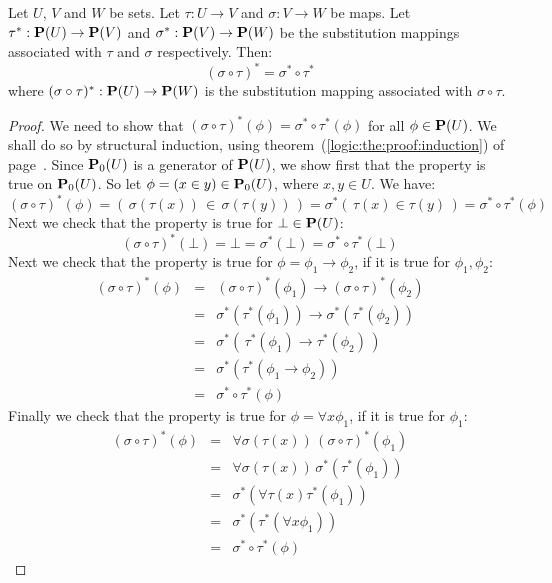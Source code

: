 \begin{prop}\label{logic:prop:substitution:composition}
    Let $U$, $V$ and $W$ be sets. Let $\tau:U\to V$ and $\sigma:V\to W$
    be maps. Let $\tau^{*}:{\bf P}(U)\to\mbox{${\bf P}(V)$}$ and $\sigma^{*}:\mbox{${\bf P}(V)$}\to{\bf
    P}(W)$ be the substitution mappings associated with $\tau$ and
    $\sigma$ respectively. Then:
    \[
        (\sigma\circ\tau)^{*}
        =
        \sigma^{*}\circ\tau^{*}
    \]
    where $(\sigma\circ\tau)^{*}:{\bf P}(U)\to {\bf P}(W)$ is the
    substitution mapping associated with $\sigma\circ\tau$.
\end{prop}
\begin{proof}
We need to show that
$(\sigma\circ\tau)^{*}(\phi)=\sigma^{*}\circ\tau^{*}(\phi)$ for all
$\phi\in{\bf P}(U)$. We shall do so by structural induction, using
theorem~(\ref{logic:the:proof:induction}) of
page~\pageref{logic:the:proof:induction}. Since ${\bf P}_{0}(U)$ is
a generator of ${\bf P}(U)$, we show first that the property is true
on ${\bf P}_{0}(U)$. So let $\phi = (x\in y)\in{\bf P}_{0}(U)$,
where $x,y\in U$. We have:
    \[
    (\sigma\circ\tau)^{*}(\phi)=(\,\sigma(\tau(x))\,\in\,\sigma(\tau(y))\,)=
    \sigma^{*}(\,\tau(x)\in\tau(y)\,)=\sigma^{*}\circ\tau^{*}(\phi)
    \]
Next we check that the property is true for $\bot\in{\bf P}(U)$:
    \[
    (\sigma\circ\tau)^{*}(\bot)=\bot=\sigma^{*}(\bot)=\sigma^{*}\circ\tau^{*}(\bot)
    \]
Next we check that the property is true for
$\phi=\phi_{1}\to\phi_{2}$, if it is true for $\phi_{1},\phi_{2}$:
    \begin{eqnarray*}
    (\sigma\circ\tau)^{*}(\phi)&=&(\sigma\circ\tau)^{*}(\phi_{1})\to
    (\sigma\circ\tau)^{*}(\phi_{2})\\
    &=&\sigma^{*}(\tau^{*}(\phi_{1}))\to\sigma^{*}(\tau^{*}(\phi_{2}))\\
    &=&\sigma^{*}(\,\tau^{*}(\phi_{1})\to\tau^{*}(\phi_{2})\,)\\
    &=&\sigma^{*}(\tau^{*}(\phi_{1}\to\phi_{2}))\\
    &=&\sigma^{*}\circ\tau^{*}(\phi)
    \end{eqnarray*}
Finally we check that the property is true for $\phi=\forall
x\phi_{1}$, if it is true for $\phi_{1}$:
    \begin{eqnarray*}
    (\sigma\circ\tau)^{*}(\phi)&=&\forall \sigma(\tau(x))\,(\sigma\circ\tau)^{*}(\phi_{1})\\
    &=&\forall\sigma(\tau(x))\,\sigma^{*}(\tau^{*}(\phi_{1}))\\
    &=&\sigma^{*}(\forall\tau(x)\tau^{*}(\phi_{1}))\\
    &=&\sigma^{*}(\tau^{*}(\forall x\phi_{1}))\\
    &=&\sigma^{*}\circ\tau^{*}(\phi)
    \end{eqnarray*}
\end{proof}

